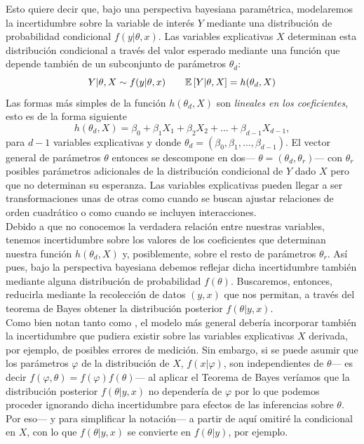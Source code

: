Esto quiere decir que, bajo una perspectiva bayesiana paramétrica, modelaremos la incertidumbre sobre la variable de interés $Y$ mediante una distribución de probabilidad condicional $f(y|\theta,x)$. Las variables explicativas $X$ determinan esta distribución condicional a través del valor esperado mediante una función que depende también de un subconjunto de parámetros $\theta_d$: 
\begin{equation} \label{eq:regr_gral}
Y|\theta,X \sim f(y|\theta,x) \qquad \mathbb{E}\left[ Y|\theta,X \right] = h(\theta_d,X)
\end{equation} 
Las formas más simples de la función $h(\theta_d,X)$ son \textit{lineales en los coeficientes}, esto es de la forma siguiente 
\begin{equation*}
h(\theta_d,X) = \beta_0 + \beta_1X_1 + \beta_2X_2 + \dots + \beta_{d-1}X_{d-1}, 
\end{equation*}
para $d-1$ variables explicativas y donde $\theta_d = (\beta_0,\beta_1,\dots,\beta_{d-1})$. El vector general de parámetros $\theta$ entonces se descompone en dos--- $\theta = (\theta_d,\theta_r)$--- con $\theta_r$ posibles parámetros adicionales de la distribución condicional de $Y$ dado $X$ pero que no determinan su esperanza. Las variables explicativas pueden llegar a ser transformaciones unas de otras como cuando se buscan ajustar relaciones de orden cuadrático o como cuando se incluyen interacciones.\\

Debido a que no conocemos la verdadera relación entre nuestras variables, tenemos incertidumbre sobre los valores de los coeficientes que determinan nuestra función $h(\theta_d ,X)$ y, posiblemente, sobre el resto de parámetros $\theta_r$. Así pues, bajo la perspectiva bayesiana debemos reflejar dicha incertidumbre también mediante alguna distribución de probabilidad $f(\theta)$. Buscaremos, entonces, reducirla mediante la recolección de datos $(y,x)$ que nos permitan, a través del teorema de Bayes obtener la distribución posterior $f(\theta|y,x)$.\\

Como bien notan tanto \textcite{Gelman13} como \textcite{Congdon06}, el modelo más general debería incorporar también la incertidumbre que pudiera existir sobre las variables explicativas $X$ derivada, por ejemplo, de posibles errores de medición. Sin embargo, si se puede asumir que los parámetros $\varphi$ de la distribución de $X$, $f(x|\varphi)$, son independientes de $\theta$--- es decir $f(\varphi,\theta)=f(\varphi)f(\theta)$--- al aplicar el Teorema de Bayes veríamos que la distribución posterior $f(\theta|y,x)$ no dependería de $\varphi$ por lo que podemos proceder ignorando dicha incertidumbre para efectos de las inferencias sobre $\theta$. Por eso--- y para simplificar la notación--- a partir de aquí omitiré la condicional en $X$, con lo que $f(\theta|y,x)$ se convierte en $f(\theta|y)$, por ejemplo. \\

